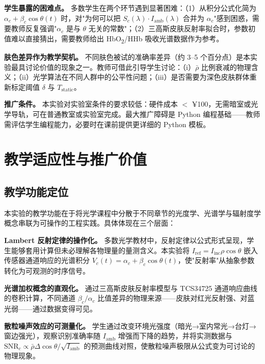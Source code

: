 \documentclass[11pt,a4paper]{ctexart}
\begin{document}
\textbf{学生暴露的困难点。} 多数学生在两个环节遇到显著困难：（1）从积分公式化简为 $\alpha_c+\beta_c\cos\theta(t)$ 时，对"为何可以把 $S_c(\lambda)\cdot I_{\mathrm{amb}}(\lambda)$ 合并为 $\alpha_c$"感到困惑，需要教师反复强调"$\alpha_c$ 是与 $\theta$ 无关的常数"；（2）三高斯皮肤反射率拟合时，参数初值难以直接猜出，需要教师给出 HbO\textsubscript{2}/HHb 吸收光谱数据作为参考。

\textbf{肤色差异作为教学契机。} 不同肤色被试的准确率差异（约 3--5 个百分点）是本实验最具讨论价值的现象之一。教师可借此引导学生讨论：（i）$\bar{\rho}$ 比例衰减的物理含义；（ii）光学算法在不同人群中的公平性问题；（iii）是否需要为深色皮肤群体重新标定阈值 $\delta$ 与 $T_{\mathrm{static}}$。

\textbf{推广条件。} 本实验对实验室条件的要求较低：硬件成本 $<$ ¥100，无需暗室或光学导轨，可在普通教室或实验室完成。最大推广障碍是 Python 编程基础——教师需评估学生编程能力，必要时在课前提供更详细的 Python 模板。

\section{教学适应性与推广价值}
\label{sec:adaptability}

\subsection{教学功能定位}
\label{sec:adaptability_function}

本实验的教学功能在于将光学课程中分散于不同章节的光度学、光谱学与辐射度学概念串联为可操作的工程实践。具体体现在三个层面：

\textbf{Lambert 反射定律的操作化。} 多数光学教材中，反射定律以公式形式呈现，学生能够套用计算但未必理解各物理量的量测含义。本实验将 $I_{\mathrm{ref}}=I_{\mathrm{inc}}\rho\cos\theta$ 嵌入传感器通道响应的光谱积分 $V_c(t)=\alpha_c+\beta_c\cos\theta(t)$，使"反射率"从抽象参数转化为可观测的时序信号。

\textbf{光谱加权概念的直观化。} 通过三高斯皮肤反射率模型与 TCS34725 通道响应曲线的卷积计算，不同通道 $\beta_c/\alpha_c$ 比值差异的物理来源——皮肤对红光反射强、对蓝光弱——通过数据变得可见。

\textbf{散粒噪声效应的可测量化。} 学生通过改变环境光强度（暗光→室内常光→台灯→窗边强光），观察识别准确率随 $I_{\mathrm{amb}}$ 增强而下降的趋势，并将实测数据与 $\mathrm{SNR}_c\propto\bar{\rho}\Delta\cos\theta/\sqrt{I_{\mathrm{amb}}}$ 的预测曲线对照，使散粒噪声极限从公式变为可讨论的物理现象。
\end{document}

